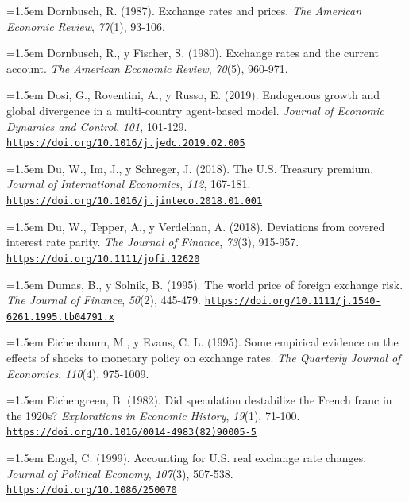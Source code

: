 \documentclass[10pt,a4paper]{article}
\begin{document}
\noindent\hangindent=1.5em Dornbusch, R. (1987). Exchange rates and prices. \textit{The American Economic Review}, \textit{77}(1), 93-106.

\noindent\hangindent=1.5em Dornbusch, R., y Fischer, S. (1980). Exchange rates and the current account. \textit{The American Economic Review}, \textit{70}(5), 960-971.

\noindent\hangindent=1.5em Dosi, G., Roventini, A., y Russo, E. (2019). Endogenous growth and global divergence in a multi-country agent-based model. \textit{Journal of Economic Dynamics and Control}, \textit{101}, 101-129. \href{https://doi.org/10.1016/j.jedc.2019.02.005}{\nolinkurl{https://doi.org/10.1016/j.jedc.2019.02.005}}

\noindent\hangindent=1.5em Du, W., Im, J., y Schreger, J. (2018). The U.S. Treasury premium. \textit{Journal of International Economics}, \textit{112}, 167-181. \href{https://doi.org/10.1016/j.jinteco.2018.01.001}{\nolinkurl{https://doi.org/10.1016/j.jinteco.2018.01.001}}

\noindent\hangindent=1.5em Du, W., Tepper, A., y Verdelhan, A. (2018). Deviations from covered interest rate parity. \textit{The Journal of Finance}, \textit{73}(3), 915-957. \href{https://doi.org/10.1111/jofi.12620}{\nolinkurl{https://doi.org/10.1111/jofi.12620}}

\noindent\hangindent=1.5em Dumas, B., y Solnik, B. (1995). The world price of foreign exchange risk. \textit{The Journal of Finance}, \textit{50}(2), 445-479. \href{https://doi.org/10.1111/j.1540-6261.1995.tb04791.x}{\nolinkurl{https://doi.org/10.1111/j.1540-6261.1995.tb04791.x}}

\noindent\hangindent=1.5em Eichenbaum, M., y Evans, C. L. (1995). Some empirical evidence on the effects of shocks to monetary policy on exchange rates. \textit{The Quarterly Journal of Economics}, \textit{110}(4), 975-1009.

\noindent\hangindent=1.5em Eichengreen, B. (1982). Did speculation destabilize the French franc in the 1920s? \textit{Explorations in Economic History}, \textit{19}(1), 71-100. \href{https://doi.org/10.1016/0014-4983(82)90005-5}{\nolinkurl{https://doi.org/10.1016/0014-4983(82)90005-5}}

\noindent\hangindent=1.5em Engel, C. (1999). Accounting for U.S. real exchange rate changes. \textit{Journal of Political Economy}, \textit{107}(3), 507-538. \href{https://doi.org/10.1086/250070}{\nolinkurl{https://doi.org/10.1086/250070}}
\end{document}
